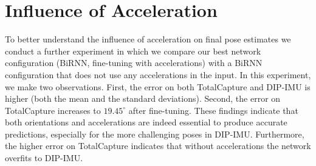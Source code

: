 \documentclass[acmtog]{acmart}
\begin{document}
\section{Influence of Acceleration}\label{sec:add_exp}
To better understand the influence of acceleration on final pose estimates we conduct a further experiment in which we compare our best network configuration (BiRNN, fine-tuning with accelerations) with a BiRNN configuration that does not use any accelerations in the input.
In this experiment, we make two observations. First, the error on both  TotalCapture and DIP-IMU is higher (both the mean and the standard deviations). Second, the error on TotalCapture increases to $19.45^\circ$ after fine-tuning. These findings indicate that both orientations and accelerations are indeed essential to produce accurate predictions, especially for the more challenging poses in DIP-IMU. Furthermore, the higher error on TotalCapture indicates that without accelerations the network overfits to DIP-IMU.
\end{document}

